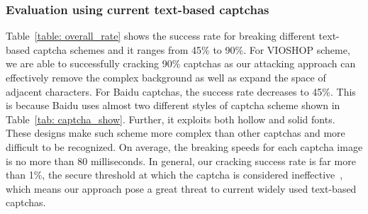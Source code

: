 \subsubsection{Evaluation using current text-based captchas}
Table~\ref{table: overall_rate} shows the success rate for breaking different text-based captcha schemes and it ranges from 45\% to 90\%. For VIOSHOP scheme, we are able to successfully cracking 90\% captchas as our attacking approach can effectively remove the complex background as well as expand the space of adjacent characters. For Baidu captchas, the success rate decreases to 45\%. This is because Baidu uses almost two different styles of captcha scheme shown in Table~\ref{tab: captcha_show}. Further, it exploits both hollow and solid fonts. These designs make such scheme more complex than other captchas and more difficult to be recognized.
On average, the breaking speeds for each captcha image is no more than 80 milliseconds.
In general, our cracking success rate is far more than 1\%, the secure threshold at which the captcha is considered ineffective~\cite{Bursztein2011Text}, which means our approach pose a great threat to current widely used text-based captchas.


